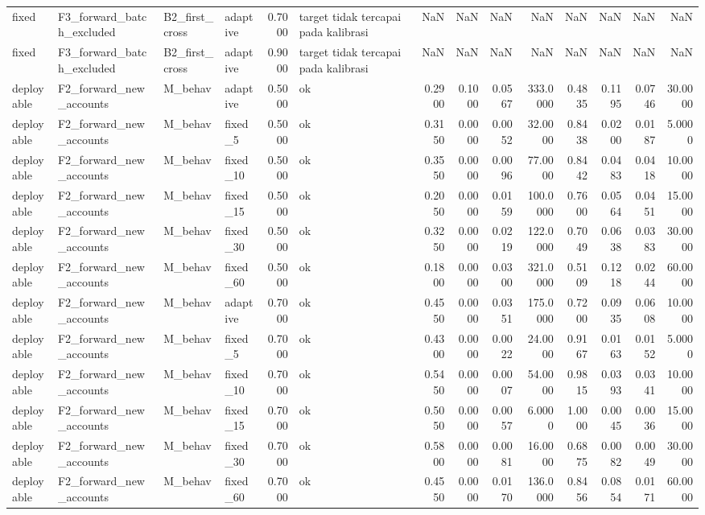 \begin{table}
\begin{tabular}{llllrlrrrrrrrr}
fixed & F3\_forward\_batch\_excluded & B2\_first\_cross & adaptive & 0.7000 & target tidak tercapai pada kalibrasi & NaN & NaN & NaN & NaN & NaN & NaN & NaN & NaN \\
fixed & F3\_forward\_batch\_excluded & B2\_first\_cross & adaptive & 0.9000 & target tidak tercapai pada kalibrasi & NaN & NaN & NaN & NaN & NaN & NaN & NaN & NaN \\
deployable & F2\_forward\_new\_accounts & M\_behav & adaptive & 0.5000 & ok & 0.2900 & 0.1000 & 0.0567 & 333.0000 & 0.4835 & 0.1195 & 0.0746 & 30.0000 \\
deployable & F2\_forward\_new\_accounts & M\_behav & fixed\_5 & 0.5000 & ok & 0.3150 & 0.0000 & 0.0052 & 32.0000 & 0.8438 & 0.0200 & 0.0187 & 5.0000 \\
deployable & F2\_forward\_new\_accounts & M\_behav & fixed\_10 & 0.5000 & ok & 0.3550 & 0.0000 & 0.0096 & 77.0000 & 0.8442 & 0.0483 & 0.0418 & 10.0000 \\
deployable & F2\_forward\_new\_accounts & M\_behav & fixed\_15 & 0.5000 & ok & 0.2050 & 0.0000 & 0.0159 & 100.0000 & 0.7600 & 0.0564 & 0.0451 & 15.0000 \\
deployable & F2\_forward\_new\_accounts & M\_behav & fixed\_30 & 0.5000 & ok & 0.3250 & 0.0000 & 0.0219 & 122.0000 & 0.7049 & 0.0638 & 0.0383 & 30.0000 \\
deployable & F2\_forward\_new\_accounts & M\_behav & fixed\_60 & 0.5000 & ok & 0.1800 & 0.0000 & 0.0300 & 321.0000 & 0.5109 & 0.1218 & 0.0244 & 60.0000 \\
deployable & F2\_forward\_new\_accounts & M\_behav & adaptive & 0.7000 & ok & 0.4550 & 0.0000 & 0.0351 & 175.0000 & 0.7200 & 0.0935 & 0.0608 & 10.0000 \\
deployable & F2\_forward\_new\_accounts & M\_behav & fixed\_5 & 0.7000 & ok & 0.4300 & 0.0000 & 0.0022 & 24.0000 & 0.9167 & 0.0163 & 0.0152 & 5.0000 \\
deployable & F2\_forward\_new\_accounts & M\_behav & fixed\_10 & 0.7000 & ok & 0.5450 & 0.0000 & 0.0007 & 54.0000 & 0.9815 & 0.0393 & 0.0341 & 10.0000 \\
deployable & F2\_forward\_new\_accounts & M\_behav & fixed\_15 & 0.7000 & ok & 0.5050 & 0.0000 & 0.0057 & 6.0000 & 1.0000 & 0.0045 & 0.0036 & 15.0000 \\
deployable & F2\_forward\_new\_accounts & M\_behav & fixed\_30 & 0.7000 & ok & 0.5800 & 0.0000 & 0.0081 & 16.0000 & 0.6875 & 0.0082 & 0.0049 & 30.0000 \\
deployable & F2\_forward\_new\_accounts & M\_behav & fixed\_60 & 0.7000 & ok & 0.4550 & 0.0000 & 0.0170 & 136.0000 & 0.8456 & 0.0854 & 0.0171 & 60.0000 \\

\end{tabular}
\end{table}
